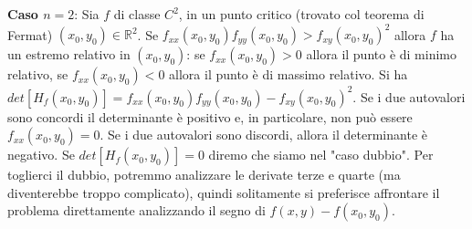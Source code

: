 \newline
\textbf{Caso $n = 2$}:\newline
Sia $f$ di classe $C^2$, in un punto critico (trovato col teorema di Fermat) $(x_0, y_0) \in \mathbb{R}^2$.\newline
Se $f_{xx}(x_0,y_0)f_{yy}(x_0,y_0) > f_{xy}(x_0,y_0)^2$ allora $f$ ha un estremo relativo in $(x_0,y_0)$: se $f_{xx} (x_0,y_0) > 0$ allora il punto è di minimo relativo, se $f_{xx}(x_0,y_0) <0$ allora il punto è di massimo relativo.\newline
Si ha $det[H_f(x_0,y_0)] = f_{xx}(x_0,y_0)f_{yy}(x_0,y_0) - f_{xy}(x_0,y_0)^2$. Se i due autovalori sono concordi il determinante è positivo e, in particolare, non può essere $f_{xx}(x_0,y_0) = 0$. Se i due autovalori sono discordi, allora il determinante è negativo.\newline
Se $det[H_f(x_0,y_0)]= 0$ diremo che siamo nel "caso dubbio". Per toglierci il dubbio, potremmo analizzare le derivate terze e quarte (ma diventerebbe troppo complicato), quindi solitamente si preferisce affrontare il problema direttamente analizzando il segno di $f(x,y)- f(x_0,y_0)$.
